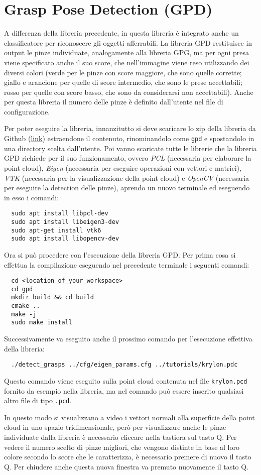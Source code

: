 \documentclass{report}
\begin{document}
\section{Grasp Pose Detection (GPD)}\label{GPD}
A differenza della libreria precedente, in questa libreria è integrato anche un classificatore per riconoscere gli oggetti afferrabili. La libreria GPD restituisce in output le pinze individuate, analogamente alla libreria GPG, ma per ogni presa viene specificato anche il suo score, che nell'immagine viene reso utilizzando dei diversi colori (verde per le pinze con score maggiore, che sono quelle corrette; giallo e arancione per quelle di score intermedio, che sono le prese accettabili; rosso per quelle con score basso, che sono da considerarsi non accettabili). Anche per questa libreria il numero delle pinze è definito dall'utente nel file di configurazione. \par
Per poter eseguire la libreria, innanzitutto si deve scaricare lo zip della libreria da Github (\textcolor{blue}{\underline{\href{https://github.com/atenpas/gpd}{link}}}) estraendone il contenuto, rinominandolo come \texttt{gpd} e spostandolo in una directory scelta dall'utente. Poi vanno scaricate tutte le librerie che la libreria GPD richiede per il suo funzionamento, ovvero \textit{PCL} (necessaria per elaborare la point cloud), \textit{Eigen} (necessaria per eseguire operazioni con vettori e matrici), \textit{VTK} (necessaria per la visualizzazione della point cloud) e \textit{OpenCV} (necessaria per eseguire la detection delle pinze), aprendo un nuovo terminale ed eseguendo in esso i comandi:
\begin{verbatim}
  sudo apt install libpcl-dev
  sudo apt install libeigen3-dev
  sudo apt-get install vtk6
  sudo apt install libopencv-dev
\end{verbatim}
Ora si può procedere con l'esecuzione della libreria GPD. Per prima cosa si effettua la compilazione eseguendo nel precedente terminale i seguenti comandi:
\begin{verbatim}
  cd <location_of_your_workspace> 
  cd gpd
  mkdir build && cd build
  cmake ..
  make -j
  sudo make install
\end{verbatim}
Successivamente va eseguito anche il prossimo comando per l'esecuzione effettiva della libreria:
\begin{verbatim}
  ./detect_grasps ../cfg/eigen_params.cfg ../tutorials/krylon.pdc
\end{verbatim}
Questo comando viene eseguito sulla point cloud contenuta nel file \texttt{krylon.pcd} fornito da esempio nella libreria, ma nel comando può essere inserito qualsiasi altro file di tipo \texttt{.pcd}. \par
In questo modo si visualizzano a video i vettori normali alla superficie della point cloud in uno spazio tridimensionale, però per visualizzare anche le pinze individuate dalla libreria è necessario cliccare nella tastiera sul tasto Q. Per vedere il numero scelto di pinze migliori, che  vengono distinte in base al loro colore secondo lo score che le caratterizza, è necessario premere di nuovo il tasto Q. Per chiudere anche questa nuova finestra va premuto nuovamente il tasto Q.
\end{document}

